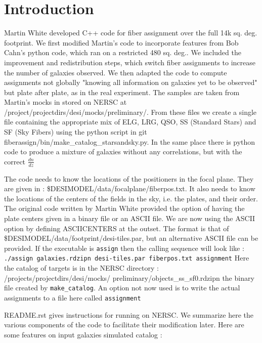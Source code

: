 \documentclass{extarticle}
\begin{document}
\section{Introduction}
Martin White developed C++ code for fiber assignment over the full 14k sq. deg. footprint.  We first modified Martin's code to incorporate features from Bob Cahn's python code, which ran on a restricted 480 sq. deg.. We included the improvement and redistribution steps, which switch fiber assignments to increase the number of galaxies observed. We then adapted the code to compute assignments not globally "knowing all information on galaxies yet to be observed" but plate after plate, as in the real experiment.
The samples are taken from Martin's mocks in stored on NERSC at /project/projectdirs/desi/mocks/preliminary/.  From these files we create a single file containing the appropriate mix of ELG, LRG, QSO, SS (Standard Stars) and SF (Sky Fibers) using the python script in git fiberassign/bin/make\_catalog\_starsandsky.py.  In the same place there is python code to produce a mixture of galaxies without any correlations, but with the correct $\frac{dn}{dz}$  
  
The code needs to know the locations of the positioners in the focal plane. They are given in : \$DESIMODEL/data/focalplane/fiberpos.txt.
It also needs to know the locations of the centers of the fields in the sky, i.e. the plates, and their order.  The original code written by Martin White provided the option of having the plate centers given in a binary file or an ASCII file.  We are now using the ASCII option by defining ASCIICENTERS at the outset. The format is that of \$DESIMODEL/data/footprint/desi-tiles.par, but an alternative ASCII file can be provided. If the executable is {\tt assign} then the calling sequence will look like :
{\tt./assign galaxies.rdzipn desi-tiles.par fiberpos.txt assignment}
 Here the catalog of targets is in the NERSC directory : /projects/projectdirs/desi/mocks/ preliminary/objects\_ss\_sf0.rdzipn the binary file created by {\tt make\_catalog}. An option not now used is to write the actual assignments to a file here called {\tt assignment}
  
README.rst gives instructions for running on NERSC.
We summarize here the various components of the code to facilitate their modification later.
Here are some features on input galaxies simulated catalog :
\end{document}
